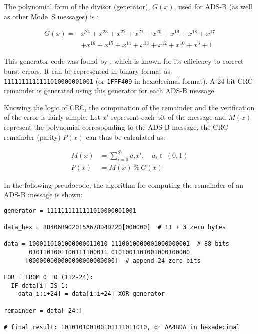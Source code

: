 The polynomial form of the divisor (generator), $G(x)$, used for ADS-B (as well as other Mode~S messages) is \cite{gertz1984}:

\begin{equation}
  \begin{split}
  G(x) = &x^{24}+x^{23}+x^{22}+x^{21}+x^{20}+x^{19}+x^{18}+x^{17} \\
         &+x^{16}+x^{15}+x^{14}+x^{13}+x^{12}+x^{10}+x^{3}+1
  \end{split}
\end{equation}


This generator code was found by \cite{kasami1964}, which is known for its efficiency to correct burst errors. It can be represented in binary format as \texttt{1111111111111010000001001} (or \texttt{1FFF409} in hexadecimal format). A 24-bit CRC remainder is generated using this generator for each ADS-B message.


Knowing the logic of CRC, the computation of the remainder and the verification of the error is fairly simple. Let  $x^{i}$ represent each bit of the message and $M(x)$ represent the polynomial corresponding to the ADS-B message, the CRC remainder (parity) $P(x)$ can thus be calculated as:

\begin{equation}
  \begin{split}
    M(x) &= \sum_{i=0}^{87} a_i x^i , \quad a_i \in (0, 1)\\
    P(x) &= M(x) ~ \% ~ G(x)
  \end{split}
\end{equation}

In the following pseudocode, the algorithm for computing the remainder of an ADS-B message is shown:

\begin{verbatim}
generator = 1111111111111010000001001

data_hex = 8D406B902015A678D4D220[000000]  # 11 + 3 zero bytes

data = 1000110101000000011010 1110010000001000000001  # 88 bits
       0101101001100111100011 0101001101001000100000
      [000000000000000000000000]  # append 24 zero bits

FOR i FROM 0 TO (112-24):
  IF data[i] IS 1:
    data[i:i+24] = data[i:i+24] XOR generator

remainder = data[-24:]

# final result: 101010100100101111011010, or AA4BDA in hexadecimal
\end{verbatim}

